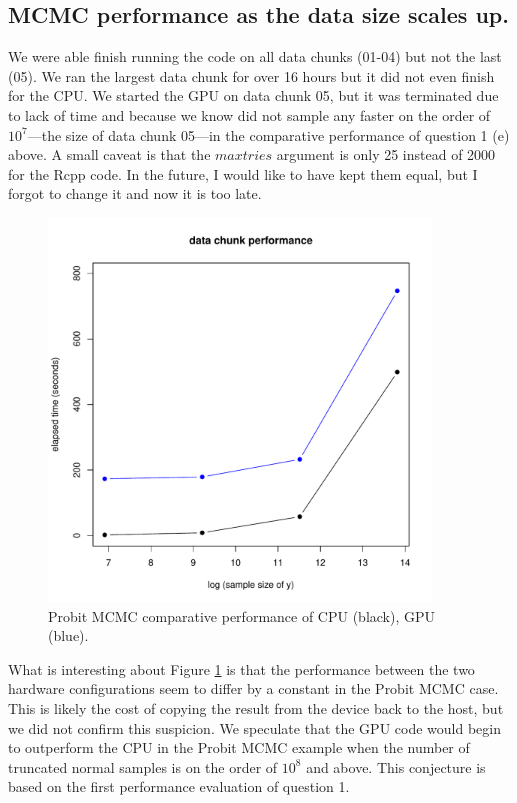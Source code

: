 \documentclass[9pt]{amsart}
\begin{document}
\newpage 

\subsection{MCMC performance as the data size scales up.}

We were able finish running the code on all data chunks (01-04) but not the last (05). We ran the largest data chunk for over 16 hours but it did not even finish for the CPU. We started the GPU on data chunk 05, but it was terminated due to lack of time and because we know did not sample any faster on the order of $10^7$---the size of data chunk 05---in the comparative performance of question 1 (e) above. A small caveat is that the $maxtries$ argument is only 25 instead of 2000 for the Rcpp code. In the future, I would like to have kept them equal, but I forgot to change it and now it is too late. 

\begin{figure}[htbp] %
   \centering
   \includegraphics[width=4in]{../data_chunk_performance.pdf} 
   \caption{Probit MCMC comparative performance of CPU (black), GPU (blue). }
   \label{fig:mcmc_profile}
\end{figure}

What is interesting about Figure \ref{fig:mcmc_profile} is that the performance between the two hardware configurations seem to differ by a constant in the Probit MCMC case. This is likely the cost of copying the result from the device back to the host, but we did not confirm this suspicion.  We speculate that the GPU code would begin to outperform the CPU in the Probit MCMC example when the number of truncated normal samples is on the order of $10^8$ and above. This conjecture is based on the first performance evaluation of question 1. 
\end{document}
